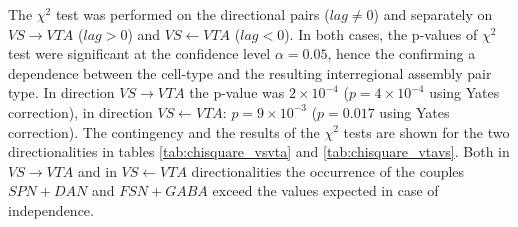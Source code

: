 The $\chi^2$ test was performed on the directional pairs ($lag\neq0$) and separately on $VS\rightarrow VTA$ ($lag>0$) and $VS\leftarrow VTA$ ($lag<0$). In both cases, the p-values of $\chi^2$ test were significant at the confidence level $\alpha = 0.05$, hence the confirming a dependence between the cell-type and the resulting interregional assembly pair type. In direction $VS\rightarrow VTA$ the p-value was $2\times10^{-4}$ ($p=4\times10^{-4}$ using Yates correction), in direction $VS\leftarrow VTA$: $p=9\times10^{-3}$ ($p=0.017$ using Yates correction). The contingency and the results of the $\chi^2$ tests are shown for the two directionalities in tables \ref{tab:chisquare_vsvta} and \ref{tab:chisquare_vtavs}. Both in $VS\rightarrow VTA$ and in $VS\leftarrow VTA$ directionalities the occurrence of the couples $SPN+DAN$ and $FSN+GABA$ exceed the values expected in case of independence.
